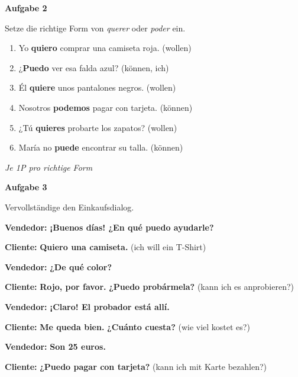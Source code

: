\documentclass[11pt, a4paper]{article}
\newcommand{\fachfarbe}{spanisch}
\newcommand{\punktebox}[1]{\hfill\fbox{\small \_/#1}}
\newcommand{\lsg}[1]{\textcolor{loesung}{\textbf{#1}}}
\newcommand{\es}[1]{\textcolor{\fachfarbe}{\textbf{#1}}}
\newenvironment{aufgabe}[1]{%
    \vspace{10pt}
    \noindent\textbf{\textcolor{\fachfarbe}{Aufgabe #1}}
    \vspace{5pt}
    \begin{list}{}{\leftmargin=0pt}
    \item[]
}{%
    \end{list}
}
\begin{document}

\begin{aufgabe}{2}
Setze die richtige Form von \textit{querer} oder \textit{poder} ein. \punktebox{6}
\end{aufgabe}

\begin{enumerate}[label=\alph*)]
    \item Yo \lsg{quiero} comprar una camiseta roja. (wollen)
    \item ¿\lsg{Puedo} ver esa falda azul? (können, ich)
    \item Él \lsg{quiere} unos pantalones negros. (wollen)
    \item Nosotros \lsg{podemos} pagar con tarjeta. (können)
    \item ¿Tú \lsg{quieres} probarte los zapatos? (wollen)
    \item María no \lsg{puede} encontrar su talla. (können)
\end{enumerate}

\textit{\textcolor{grau}{Je 1P pro richtige Form}}

\vspace{15pt}


\begin{aufgabe}{3}
Vervollständige den Einkaufsdialog. \punktebox{6}
\end{aufgabe}

\noindent
\textbf{Vendedor:} \es{¡Buenos días! ¿En qué puedo ayudarle?}

\noindent
\textbf{Cliente:} \lsg{Quiero una camiseta.} (ich will ein T-Shirt)

\noindent
\textbf{Vendedor:} \es{¿De qué color?}

\noindent
\textbf{Cliente:} \es{Rojo, por favor.} \lsg{¿Puedo probármela?} (kann ich es anprobieren?)

\noindent
\textbf{Vendedor:} \es{¡Claro! El probador está allí.}

\noindent
\textbf{Cliente:} \es{Me queda bien.} \lsg{¿Cuánto cuesta?} (wie viel kostet es?)

\noindent
\textbf{Vendedor:} \es{Son 25 euros.}

\noindent
\textbf{Cliente:} \lsg{¿Puedo pagar con tarjeta?} (kann ich mit Karte bezahlen?)
\end{document}
